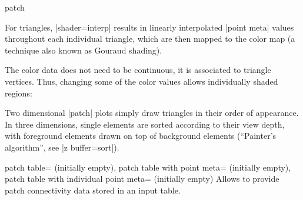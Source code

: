 {\begin{plottype}[/pgfplots]{patch}
\begin{codeexample}[]
\end{codeexample}
    \noindent For triangles, |shader=interp| results in linearly interpolated
    |point meta| values throughout each individual triangle, which are then
    mapped to the color map (a technique also known as Gouraud shading).

    The color data does not need to be continuous, it is associated to triangle
    vertices. Thus, changing some of the color values allows individually
    shaded regions:
\begin{codeexample}[]
\end{codeexample}

    Two dimensional |patch| plots simply draw triangles in their order of
    appearance. In three dimensions, single elements are sorted according to
    their view depth, with foreground elements drawn on top of background
    elements (``Painter's algorithm'', see |z buffer=sort|).

    \begin{pgfplotskeylist}{%
        patch table= (initially empty),
        patch table with point meta= (initially empty),
        patch table with individual point meta= (initially empty)%
    }
        Allows to provide patch connectivity data stored in an input table.


\end{pgfplotskeylist}
\end{plottype}}
